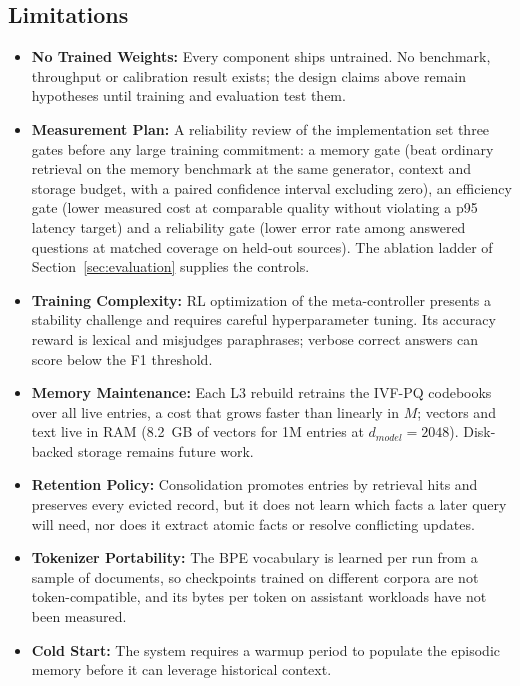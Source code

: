 \documentclass{article}
\begin{document}
\subsection{Limitations}

\begin{itemize}
    \item \textbf{No Trained Weights:} Every component ships untrained. No benchmark, throughput or calibration result exists; the design claims above remain hypotheses until training and evaluation test them.
    \item \textbf{Measurement Plan:} A reliability review of the implementation set three gates before any large training commitment: a memory gate (beat ordinary retrieval on the memory benchmark at the same generator, context and storage budget, with a paired confidence interval excluding zero), an efficiency gate (lower measured cost at comparable quality without violating a p95 latency target) and a reliability gate (lower error rate among answered questions at matched coverage on held-out sources). The ablation ladder of Section~\ref{sec:evaluation} supplies the controls.
    \item \textbf{Training Complexity:} RL optimization of the meta-controller presents a stability challenge and requires careful hyperparameter tuning. Its accuracy reward is lexical and misjudges paraphrases; verbose correct answers can score below the F1 threshold.
    \item \textbf{Memory Maintenance:} Each L3 rebuild retrains the IVF-PQ codebooks over all live entries, a cost that grows faster than linearly in $M$; vectors and text live in RAM (8.2~GB of vectors for 1M entries at $d_{model}=2048$). Disk-backed storage remains future work.
    \item \textbf{Retention Policy:} Consolidation promotes entries by retrieval hits and preserves every evicted record, but it does not learn which facts a later query will need, nor does it extract atomic facts or resolve conflicting updates.
    \item \textbf{Tokenizer Portability:} The BPE vocabulary is learned per run from a sample of documents, so checkpoints trained on different corpora are not token-compatible, and its bytes per token on assistant workloads have not been measured.
    \item \textbf{Cold Start:} The system requires a warmup period to populate the episodic memory before it can leverage historical context.
\end{itemize}
\end{document}
